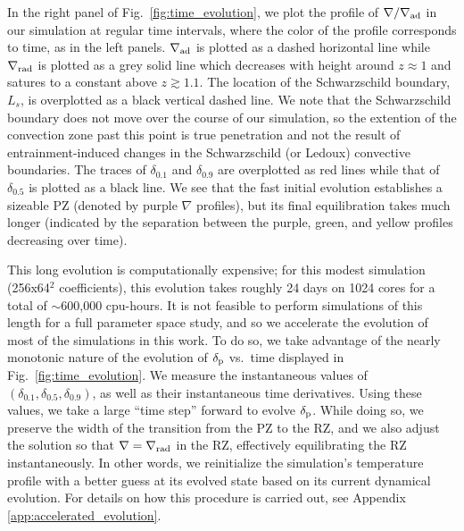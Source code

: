 \documentclass[twocolumn, linenumbers]{aastex631}
\newcommand{\gradrad}{\ensuremath{\nabla_{\rm{rad}}}}
\newcommand{\gradad}{\ensuremath{\nabla_{\rm{ad}}}}
\newcommand{\justgrad}{\ensuremath{\nabla}}
\newcommand{\delp}{\ensuremath{\delta_{\rm{p}}}}
\newcommand{\editone}[1]{#1}
\begin{document}
In the right panel of Fig.~\ref{fig:time_evolution}, we plot the profile of $\justgrad/\gradad$ in our simulation at regular time intervals, where the color of the profile corresponds to time, as in the left panels.
$\gradad$ is plotted as a dashed horizontal line while $\gradrad$ is plotted as a grey solid line which decreases with height around $z \approx 1$ and satures to a constant above $z \gtrsim 1.1$.
The location of the Schwarzschild boundary, $L_s$, is overplotted as a black vertical dashed line.
We note that the Schwarzschild boundary does not move over the course of our simulation, so the extention of the convection zone past this point is true penetration and not the result of entrainment-induced changes in the Schwarzschild (or Ledoux) convective boundaries.
The traces of $\delta_{0.1}$ and $\delta_{0.9}$ are overplotted as red lines while that of $\delta_{0.5}$ is plotted as a black line.
We see that the fast initial evolution establishes a sizeable PZ (denoted by purple $\justgrad$ profiles), but its final equilibration takes much longer (indicated by the separation between the purple, green, and yellow profiles decreasing over time).

This long evolution is computationally expensive; for this modest simulation (256x64$^2$ coefficients), this evolution takes roughly 24 days on 1024 cores for a total of $\sim$600,000 cpu-hours.
It is not feasible to perform simulations of this length for a full parameter space study, and so we accelerate the evolution of most of the simulations in this work.
To do so, we take advantage of the nearly monotonic nature of the evolution of $\delp$ vs.~time displayed in Fig.~\ref{fig:time_evolution}.
We measure the instantaneous values of $(\delta_{0.1}, \delta_{0.5}, \delta_{0.9})$, as well as their instantaneous time derivatives.
Using these values, we take a large ``time step'' forward \editone{to evolve $\delp$.}
While doing so, we preserve the width of the transition from the PZ to the RZ, and we also adjust the solution so that $\justgrad = \gradrad$ in the RZ, effectively equilibrating the RZ instantaneously.
In other words, we reinitialize the simulation's temperature profile with a better guess at its evolved state based on its current dynamical evolution.
For details on how this procedure is carried out, see Appendix \ref{app:accelerated_evolution}.
\end{document}
